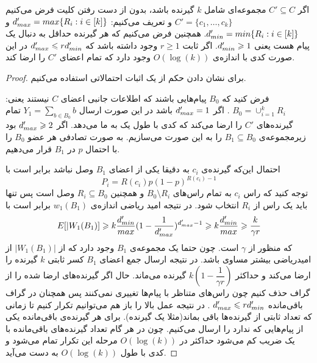 \begin{lemma}
	\label{lemma:pliable2015:3}
	اگر
	$C' \subseteq C$
	مجموعه‌ای شامل 
	$k$
	گیرنده‌ باشد، بدون از دست رفتن کلیت فرض می‌کنیم
	$C' = \{c_1, \ldots, c_k\}$
	و تعریف می‌کنیم:
	$d_{max}' = max\{R_i: i \in [k] \}$
	و
	$d_{min}' = min\{R_i: i \in [k] \}$.
 همچنین فرض می‌کنیم که هر گیرنده حداقل به دنبال یک پیام هست یعنی
	$d_{min}' \geqslant 1$. 
 اگر ثابت
	$r \geq 1$
	وجود داشته باشد که
	$d_{max}' \leqslant r d_{min}'$
	در این صورت کدی با اندازه‌ی
	$O(\log(k))$
	وجود دارد که تمام اعضای
	$C'$
	را ارضا کند.
\end{lemma}
\begin{proof}
	برای نشان دادن حکم از یک اثبات احتمالاتی استفاده می‌کنیم.
	
	فرض کنید که
	$B_0$
	پیام‌هایی باشند که اطلاعات جانبی اعضای
	$C$
	نیستند یعنی:
	$B_0 = \cup_{i = 1}^{k} R_i$
	. اگر
	$d_{max}' = 1$
	باشد در این صورت ارسال
	$Y_1 = \sum_{b \in B_0} b$
	تمام گیرنده‌های
	$C'$
	را ارضا می‌کند که کدی با طول یک به ما می‌دهد. اگر
	$d_{max}' \geqslant 2$
	بود زیرمجموعه‌ی
	$B_1 \subseteq B_0$
	را به این صورت می‌سازیم. به صورت تصادفی هر عضو
	$B_0$
	را با احتمال
	$p$
	در 
	$B_1$
	قرار می‌دهیم.
	
	احتمال این‌که گیرنده‌ی
	$c_i$
	به دقیقا یکی از اعضای 
	$B_1$
	وصل نباشد برابر است با
	$$P_i = R(c_i) p (1 - p)^{R(c_i) - 1}$$
	توجه کنید که راس
	$c_i$
	به تمام راس‌های
	$B_0 \setminus R_i$
	و همچنین
	$R_i \subseteq B_0$
	وصل است پس تنها باید یک راس از
	$R_i$
	انتخاب شود. در نتیجه امید ریاضی اندازه‌ی
	$w_1(B_1)$
	برابر است با
	\begin{equation}
		E[|W_1(B_1)] \geqslant k \dfrac{d_{min}'}{max}(1 - \dfrac{1}{d_{max}'})^{d_{max}' - 1} \geqslant k \dfrac{d_{min}'}{max} \geqslant \dfrac{k}{\gamma r}
	\end{equation}
	که منظور از
	$\gamma$
	است. چون حتما یک مجموعه‌ی
	$B_1$
	وجود دارد که از 
	$|W_1(B_1)|$
	از امیدریاضی بیشتر مساوی باشد. در نتیجه ارسال جمع اعضای
	$B_1$
	کسر ثابتی
	$k$
	گیرنده‌ را ارضا می‌کند و حداکثر
	$k(1 - \dfrac{1}{\gamma r})$
	گیرنده می‌ماند. حال اگر گیرنده‌های ارضا شده را از گراف حذف کنیم چون راس‌های متناظر با پیام‌ها تغییری نمی‌کنند پس همچنان در گراف باقی‌مانده
	$d_{max}' \leqslant r d_{min}'$
	. در نتیجه عمل بالا را باز هم می‌توانیم تکرار کنیم تا زمانی که تعداد ثابتی از گیرنده‌ها باقی بماند(مثلا یک گیرنده). برای هر گیرنده‌ی باقی‌مانده یکی از پیام‌هایی که ندارد را ارسال می‌کنیم. چون در هر گام تعداد گیرنده‌های باقی‌مانده با یک ضریب کم می‌شود حداکثر در
	$O(\log(k))$
	مرحله این تکرار تمام می‌شود و کدی با طول
	$O(\log(k))$
	به دست می‌آید.
\end{proof}

